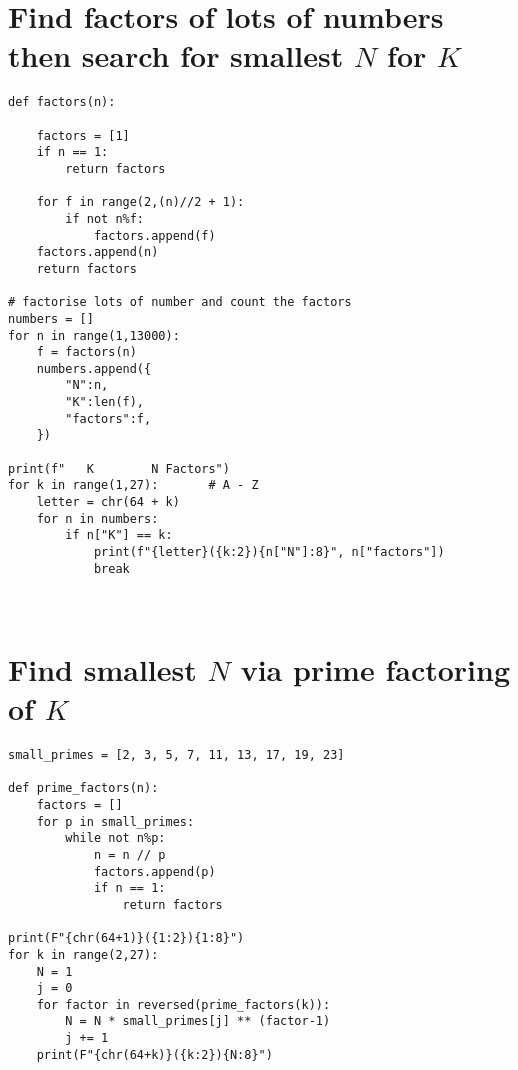\documentclass{article}
\begin{document}
\section*{Find factors of lots of numbers then search for smallest $N$ for $K$}
\begin{verbatim}
def factors(n):
    
    factors = [1]
    if n == 1:
        return factors

    for f in range(2,(n)//2 + 1):
        if not n%f:
            factors.append(f)
    factors.append(n)
    return factors

# factorise lots of number and count the factors
numbers = []
for n in range(1,13000):
    f = factors(n) 
    numbers.append({
        "N":n,
        "K":len(f),
        "factors":f,
    })    

print(f"   K        N Factors")
for k in range(1,27):       # A - Z
    letter = chr(64 + k)
    for n in numbers:
        if n["K"] == k:
            print(f"{letter}({k:2}){n["N"]:8}", n["factors"])
            break



\end{verbatim}
\section*{Find smallest $N$ via prime factoring of $K$}

\begin{verbatim}
small_primes = [2, 3, 5, 7, 11, 13, 17, 19, 23]

def prime_factors(n):
    factors = []
    for p in small_primes:
        while not n%p:
            n = n // p
            factors.append(p)
            if n == 1:
                return factors

print(F"{chr(64+1)}({1:2}){1:8}")
for k in range(2,27):
    N = 1
    j = 0
    for factor in reversed(prime_factors(k)):
        N = N * small_primes[j] ** (factor-1)
        j += 1
    print(F"{chr(64+k)}({k:2}){N:8}")
\end{verbatim}
\end{document}
